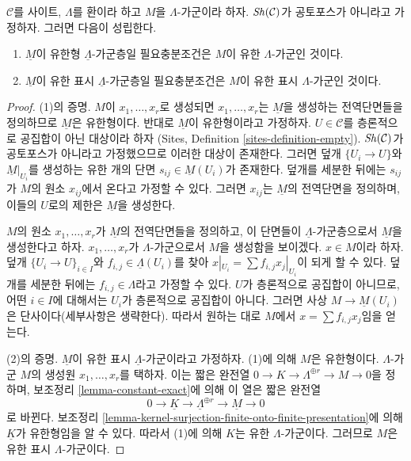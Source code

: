 \begin{lemma}
\label{lemma-locally-constant-finite-type}
$\mathcal{C}$를 사이트, $\Lambda$를 환이라 하고 $M$을
$\Lambda$-가군이라 하자. $\mathop{\mathit{Sh}}\nolimits(\mathcal{C})$가 공토포스가 아니라고
가정하자. 그러면 다음이 성립한다.
\begin{enumerate}
\item $\underline{M}$이 유한형 $\underline{\Lambda}$-가군층일
필요충분조건은 $M$이 유한 $\Lambda$-가군인 것이다.
\item $\underline{M}$이 유한 표시 $\underline{\Lambda}$-가군층일
필요충분조건은 $M$이 유한 표시 $\Lambda$-가군인 것이다.
\end{enumerate}
\end{lemma}

\begin{proof}
(1)의 증명. $M$이 $x_1, \ldots, x_r$로 생성되면
$x_1, \ldots, x_r$는 $\underline{M}$을 생성하는 전역단면들을 정의하므로
$\underline{M}$은 유한형이다. 반대로 $\underline{M}$이 유한형이라고
가정하자. $U \in \mathcal{C}$를 층론적으로 공집합이 아닌 대상이라 하자
(Sites, Definition \ref{sites-definition-empty}).
$\mathop{\mathit{Sh}}\nolimits(\mathcal{C})$가 공토포스가 아니라고 가정했으므로 이러한 대상이
존재한다. 그러면 덮개 $\{U_i \to U\}$와
$\underline{M}|_{U_i}$를 생성하는 유한 개의 단면
$s_{ij} \in \underline{M}(U_i)$가 존재한다. 덮개를 세분한 뒤에는
$s_{ij}$가 $M$의 원소 $x_{ij}$에서 온다고 가정할 수 있다. 그러면
$x_{ij}$는 $\underline{M}$의 전역단면을 정의하며, 이들의 $U$로의
제한은 $\underline{M}$을 생성한다.

\medskip\noindent
$M$의 원소 $x_1, \ldots, x_r$가 $\underline{M}$의 전역단면들을
정의하고, 이 단면들이 $\underline{\Lambda}$-가군층으로서
$\underline{M}$을 생성한다고 하자.
$x_1, \ldots, x_r$가 $\Lambda$-가군으로서 $M$을 생성함을 보이겠다.
$x \in M$이라 하자. 덮개 $\{U_i \to U\}_{i \in I}$와
$f_{i, j} \in \underline{\Lambda}(U_i)$를 찾아
$x|_{U_i} = \sum f_{i, j} x_j|_{U_i}$이 되게 할 수 있다.
덮개를 세분한 뒤에는 $f_{i, j} \in \Lambda$라고 가정할 수 있다.
$U$가 층론적으로 공집합이 아니므로, 어떤 $i \in I$에 대해서는
$U_i$가 층론적으로 공집합이 아니다. 그러면 사상
$M \to \underline{M}(U_i)$은 단사이다(세부사항은 생략한다).
따라서 원하는 대로 $M$에서 $x = \sum f_{i, j}x_j$임을 얻는다.

\medskip\noindent
(2)의 증명. $\underline{M}$이 유한 표시
$\underline{\Lambda}$-가군이라고 가정하자. (1)에 의해 $M$은
유한형이다. $\Lambda$-가군 $M$의 생성원 $x_1, \ldots, x_r$를 택하자.
이는 짧은 완전열 $0 \to K \to \Lambda^{\oplus r} \to M \to 0$을
정하며, 보조정리 \ref{lemma-constant-exact}에 의해 이 열은 짧은 완전열
$$
0 \to \underline{K} \to \underline{\Lambda}^{\oplus r} \to \underline{M} \to 0
$$
로 바뀐다. 보조정리
\ref{lemma-kernel-surjection-finite-onto-finite-presentation}에 의해
$\underline{K}$가 유한형임을 알 수 있다. 따라서 (1)에 의해 $K$는
유한 $\Lambda$-가군이다. 그러므로 $M$은 유한 표시
$\Lambda$-가군이다.
\end{proof}




